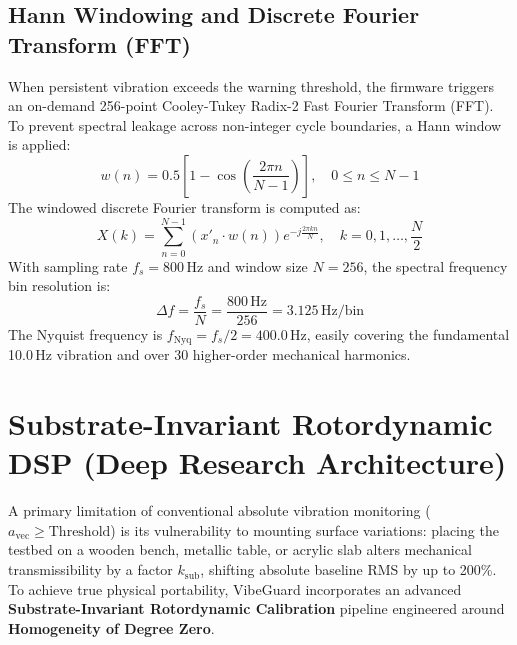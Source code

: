\subsection{Hann Windowing and Discrete Fourier Transform (FFT)}
\hspace{2em}When persistent vibration exceeds the warning threshold, the firmware triggers an on-demand 256-point Cooley-Tukey Radix-2 Fast Fourier Transform (FFT). To prevent spectral leakage across non-integer cycle boundaries, a Hann window is applied:
\begin{equation}
w(n) = 0.5 \left[ 1 - \cos\left(\frac{2\pi n}{N - 1}\right) \right], \quad 0 \le n \le N-1
\label{eq:hann_window}
\end{equation}
The windowed discrete Fourier transform is computed as:
\begin{equation}
X(k) = \sum_{n=0}^{N-1} \left( x'_n \cdot w(n) \right) e^{-j \frac{2\pi k n}{N}}, \quad k = 0, 1, \dots, \frac{N}{2}
\label{eq:fft_formula}
\end{equation}
With sampling rate $f_s = 800\,\text{Hz}$ and window size $N = 256$, the spectral frequency bin resolution is:
\begin{equation}
\Delta f = \frac{f_s}{N} = \frac{800\,\text{Hz}}{256} = 3.125\,\text{Hz/bin}
\end{equation}
The Nyquist frequency is $f_{\mathrm{Nyq}} = f_s / 2 = 400.0\,\text{Hz}$, easily covering the fundamental 10.0\,Hz vibration and over 30 higher-order mechanical harmonics.

\section{Substrate-Invariant Rotordynamic DSP (Deep Research Architecture)}
\hspace{2em}A primary limitation of conventional absolute vibration monitoring ($a_{\mathrm{vec}} \ge \text{Threshold}$) is its vulnerability to mounting surface variations: placing the testbed on a wooden bench, metallic table, or acrylic slab alters mechanical transmissibility by a factor $k_{\mathrm{sub}}$, shifting absolute baseline RMS by up to 200\%. To achieve true physical portability, VibeGuard incorporates an advanced \textbf{Substrate-Invariant Rotordynamic Calibration} pipeline engineered around \textbf{Homogeneity of Degree Zero}.

